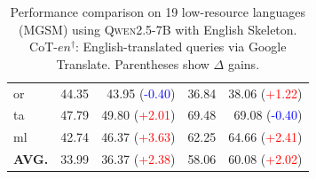 \begin{table}[!t]
{\begin{tabular}{lrrrr}
or & 44.35 & 43.95 (\textcolor{blue}{-0.40}) & 36.84 & 38.06 (\textcolor{red}{+1.22}) \\
ta & 47.79 & 49.80 (\textcolor{red}{+2.01}) & 69.48 & 69.08 (\textcolor{blue}{-0.40}) \\
ml & 42.74 & 46.37 (\textcolor{red}{+3.63}) & 62.25 & 64.66 (\textcolor{red}{+2.41}) \\
\midrule
\textbf{AVG.}
 & 33.99 & 36.37 (\textcolor{red}{+2.38})
 & 58.06 & 60.08 (\textcolor{red}{+2.02}) \\
\bottomrule
\end{tabular}
}
\caption{\small Performance comparison on 19 low-resource languages (MGSM) using \textsc{Qwen2.5-7B} with English Skeleton. CoT-$en^{\dagger}$: English-translated queries via Google Translate. Parentheses show $\Delta$ gains.}
\label{tab:low-resource-mgsm}
    \vspace{-0.15in}
\end{table}
